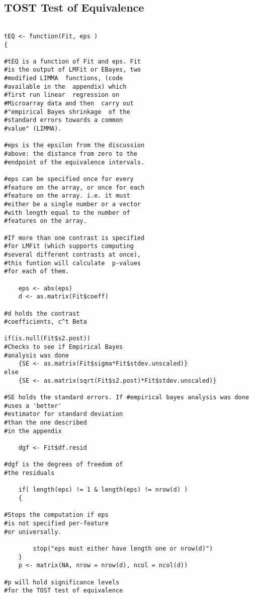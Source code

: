 \subsection{TOST Test of Equivalence}

\begin{verbatim}

tEQ <- function(Fit, eps )
{
	
#tEQ is a function of Fit and eps. Fit 
#is the output of LMFit or EBayes, two 
#modified LIMMA  functions, (code 
#available in the  appendix) which 
#first run linear  regression on 
#Microarray data and then  carry out 
#"empirical Bayes shrinkage  of the 
#standard errors towards a common 
#value" (LIMMA).

#eps is the epsilon from the discussion  
#above: the distance from zero to the  
#endpoint of the equivalence intervals. 

#eps can be specified once for every  
#feature on the array, or once for each  
#feature on the array. i.e. it must  
#either be a single number or a vector  
#with length equal to the number of  
#features on the array.

#If more than one contrast is specified  
#for LMFit (which supports computing  
#several different contrasts at once),  
#this funtion will calculate  p-values  
#for each of them.

	eps <- abs(eps)
	d <- as.matrix(Fit$coeff) 
	
#d holds the contrast 
#coefficients, c^t Beta 

if(is.null(Fit$s2.post))
#Checks to see if Empirical Bayes
#analysis was done
	{SE <- as.matrix(Fit$sigma*Fit$stdev.unscaled)}
else
	{SE <- as.matrix(sqrt(Fit$s2.post)*Fit$stdev.unscaled)}
	
#SE holds the standard errors. If #empirical bayes analysis was done
#uses a 'better'  
#estimator for standard deviation  
#than the one described  
#in the appendix

	dgf <- Fit$df.resid
	
#dgf is the degrees of freedom of  
#the residuals

	if( length(eps) != 1 & length(eps) != nrow(d) )
	{
		
#Stops the computation if eps  
#is not specified per-feature   
#or universally.

		stop("eps must either have length one or nrow(d)")
	}			
	p <- matrix(NA, nrow = nrow(d), ncol = ncol(d))
	
#p will hold significance levels   
#for the TOST test of equivalence 


\end{verbatim}
